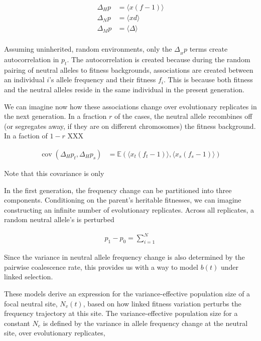 \documentclass[11pt]{article}
\newcommand{\E}{\mathbb{E}}
\DeclareMathOperator{\cov}{cov}
\begin{document}
\begin{align}
  \Delta_H p &= \langle x (f-1) \rangle \\
  \Delta_N p &= \langle x d \rangle \\
  \Delta_M p &= \langle \Delta \rangle \\
\end{align}

Assuming uninherited, random environments, only the $\Delta_{_H} p$ terms
create autocorrelation in $p_t$. The autocorrelation is created because during
the random pairing of neutral alleles to fitness backgrounds, associations are
created between an individual $i$'s allele frequency and their fitness $f_i$.
This is because both fitness and the neutral alleles reside in the same
individual in the present generation. 

We can imagine now how these associations change over evolutionary replicates
in the next generation. In a fraction $r$ of the cases, the neutral allele 
recombines off (or segregates away, if they are on different chromosomes) the
fitness background. In a faction of $1-r$ XXX

\begin{align}
  \cov(\Delta_H p_t, \Delta_H p_s) &= \E(\langle x_t (f_t-1) \rangle , \langle x_s (f_s-1) \rangle)
\end{align}

Note that this covariance is only 


In the first generation, the frequency change
can be partitioned into three components. Conditioning on the parent's
heritable fitnesses, we can imagine constructing an infinite number of
evolutionary replicates. Across all replicates, a random neutral allele's is
perturbed 

\begin{align}
  p_1 - p_0 = \sum_{i=1}^{N} 
\end{align}



Since the variance in neutral allele frequency change is also determined by the
pairwise coalescence rate, this provides us with a way to model $b(t)$ under
linked selection.




These models derive an expression for the variance-effective population size of
a focal neutral site, $N_v(t)$, based on how linked fitness variation perturbs
the frequency trajectory at this site.  The variance-effective population size
for a constant $N_e$ is defined by the variance in allele frequency change at
the neutral site, over evolutionary replicates, 
\end{document}

